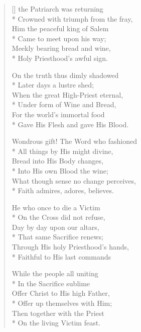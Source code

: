 \newHymn


\begin{verse}[\versewidth]
 the Patriarch was returning\\*
Crowned with triumph from the fray,\\
Him the peaceful king of Salem\\*
Came to meet upon his way;\\
Meekly bearing bread and wine,\\*
Holy Priesthood's awful sign.

On the truth thus dimly shadowed\\*
Later days a lustre shed;\\
When the great High-Priest eternal,\\*
Under form of Wine and Bread,\\
For the world's immortal food\\*
Gave His Flesh and gave His Blood.

Wondrous gift! The Word who fashioned\\*
All things by His might divine,\\
Bread into His Body changes,\\*
Into His own Blood the wine;\\
What though sense no change perceives,\\*
Faith admires, adores, believes.

He who once to die a Victim\\*
On the Cross did not refuse,\\
Day by day upon our altars,\\*
That same Sacrifice renews;\\
Through His holy Priesthood's hands,\\*
Faithful to His last commands

While the people all uniting\\*
In the Sacrifice sublime\\
Offer Christ to His high Father,\\*
Offer up themselves with Him;\\
Then together with the Priest\\*
On the living Victim feast.

\end{verse}



